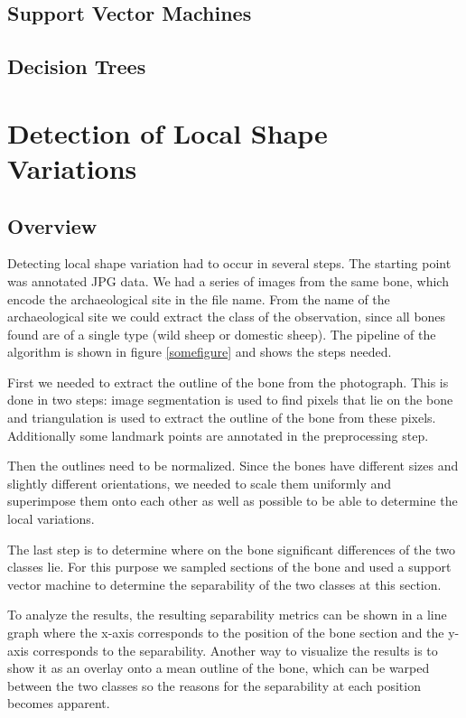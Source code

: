\documentclass[pdftex,12pt,a4paper]{report}
\begin{document}
\section{Support Vector Machines}

\cite{pedregosa2011scikit}

\section{Decision Trees}

\chapter{Detection of Local Shape Variations}

\section{Overview}

Detecting local shape variation had to occur in several steps. The starting point was annotated JPG data. We had a series of images from the same bone, which encode the archaeological site in the file name. From the name of the archaeological site we could extract the class of the observation, since all bones found are of a single type (wild sheep or domestic sheep). The pipeline of the algorithm is shown in figure \ref{somefigure} and shows the steps needed.

First we needed to extract the outline of the bone from the photograph. This is done in two steps: image segmentation is used to find pixels that lie on the bone and triangulation is used to extract the outline of the bone from these pixels. Additionally some landmark points are annotated in the preprocessing step.

Then the outlines need to be normalized. Since the bones have different sizes and slightly different orientations, we needed to scale them uniformly and superimpose them onto each other as well as possible to be able to determine the local variations.

The last step is to determine where on the bone significant differences of the two classes lie. For this purpose we sampled sections of the bone and used a support vector machine to determine the separability of the two classes at this section.

To analyze the results, the resulting separability metrics can be shown in a line graph where the x-axis corresponds to the position of the bone section and the y-axis corresponds to the separability. Another way to visualize the results is to show it as an overlay onto a mean outline of the bone, which can be warped between the two classes so the reasons for the separability at each position becomes apparent.
\end{document}
